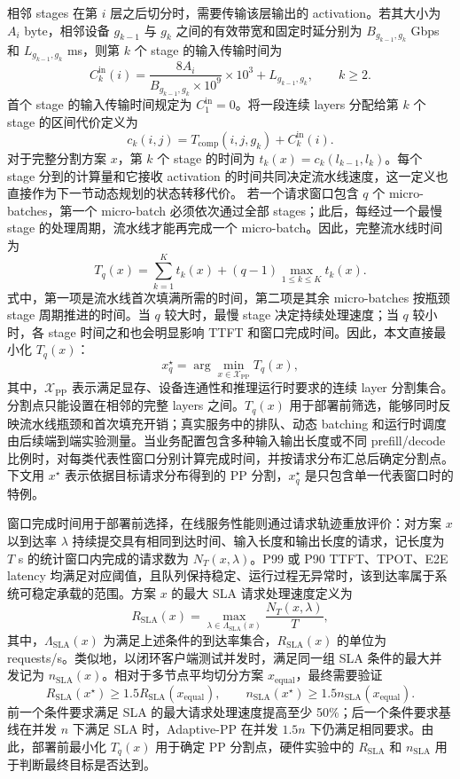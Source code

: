 相邻 stages 在第 \(i\) 层之后切分时，需要传输该层输出的 activation。若其大小为 \(A_i\) byte，相邻设备 \(g_{k-1}\) 与 \(g_k\) 之间的有效带宽和固定时延分别为 \(B_{g_{k-1},g_k}\) Gbps 和 \(L_{g_{k-1},g_k}\) ms，则第 \(k\) 个 stage 的输入传输时间为
\[
C_k^{\mathrm{in}}(i)=
\frac{8A_i}{B_{g_{k-1},g_k}\times10^9}\times10^3
+L_{g_{k-1},g_k},\qquad k\geq2.
\]
首个 stage 的输入传输时间规定为 \(C_1^{\mathrm{in}}=0\)。将一段连续 layers 分配给第 \(k\) 个 stage 的区间代价定义为
\[
c_k(i,j)=T_{\mathrm{comp}}(i,j,g_k)+C_k^{\mathrm{in}}(i).
\]
对于完整分割方案 \(x\)，第 \(k\) 个 stage 的时间为 \(t_k(x)=c_k(l_{k-1},l_k)\)。每个 stage 分到的计算量和它接收 activation 的时间共同决定流水线速度，这一定义也直接作为下一节动态规划的状态转移代价。
若一个请求窗口包含 \(q\) 个 micro-batches，第一个 micro-batch 必须依次通过全部 stages；此后，每经过一个最慢 stage 的处理周期，流水线才能再完成一个 micro-batch。因此，完整流水线时间为
\[
T_q(x)=\sum_{k=1}^{K}t_k(x)
+(q-1)\max_{1\leq k\leq K}t_k(x).
\]
式中，第一项是流水线首次填满所需的时间，第二项是其余 micro-batches 按瓶颈 stage 周期推进的时间。当 \(q\) 较大时，最慢 stage 决定持续处理速度；当 \(q\) 较小时，各 stage 时间之和也会明显影响 TTFT 和窗口完成时间。因此，本文直接最小化 \(T_q(x)\)：
\[
x_q^\star=\arg\min_{x\in\mathcal X_{\mathrm{PP}}}T_q(x),
\]
其中，\(\mathcal X_{\mathrm{PP}}\) 表示满足显存、设备连通性和推理运行时要求的连续 layer 分割集合。分割点只能设置在相邻的完整 layers 之间。\(T_q(x)\) 用于部署前筛选，能够同时反映流水线瓶颈和首次填充开销；真实服务中的排队、动态 batching 和运行时调度由后续端到端实验测量。当业务配置包含多种输入输出长度或不同 prefill/decode 比例时，对每类代表性窗口分别计算完成时间，并按请求分布汇总后确定分割点。下文用 \(x^\star\) 表示依据目标请求分布得到的 PP 分割，\(x_q^\star\) 是只包含单一代表窗口时的特例。

窗口完成时间用于部署前选择，在线服务性能则通过请求轨迹重放评价：对方案 \(x\) 以到达率 \(\lambda\) 持续提交具有相同到达时间、输入长度和输出长度的请求，记长度为 \(T\) s 的统计窗口内完成的请求数为 \(N_T(x,\lambda)\)。P99 或 P90 TTFT、TPOT、E2E latency 均满足对应阈值，且队列保持稳定、运行过程无异常时，该到达率属于系统可稳定承载的范围。方案 \(x\) 的最大 SLA 请求处理速度定义为
\[
R_{\mathrm{SLA}}(x)=
\max_{\lambda\in\Lambda_{\mathrm{SLA}}(x)}
\frac{N_T(x,\lambda)}{T},
\]
其中，\(\Lambda_{\mathrm{SLA}}(x)\) 为满足上述条件的到达率集合，\(R_{\mathrm{SLA}}(x)\) 的单位为 requests/s。类似地，以闭环客户端测试并发时，满足同一组 SLA 条件的最大并发记为 \(n_{\mathrm{SLA}}(x)\)。相对于多节点平均切分方案 \(x_{\mathrm{equal}}\)，最终需要验证
\[
R_{\mathrm{SLA}}(x^\star)
\geq1.5R_{\mathrm{SLA}}(x_{\mathrm{equal}}),
\qquad
n_{\mathrm{SLA}}(x^\star)
\geq1.5n_{\mathrm{SLA}}(x_{\mathrm{equal}}).
\]
前一个条件要求满足 SLA 的最大请求处理速度提高至少 50\%；后一个条件要求基线在并发 \(n\) 下满足 SLA 时，Adaptive-PP 在并发 \(1.5n\) 下仍满足相同要求。由此，部署前最小化 \(T_q(x)\) 用于确定 PP 分割点，硬件实验中的 \(R_{\mathrm{SLA}}\) 和 \(n_{\mathrm{SLA}}\) 用于判断最终目标是否达到。


